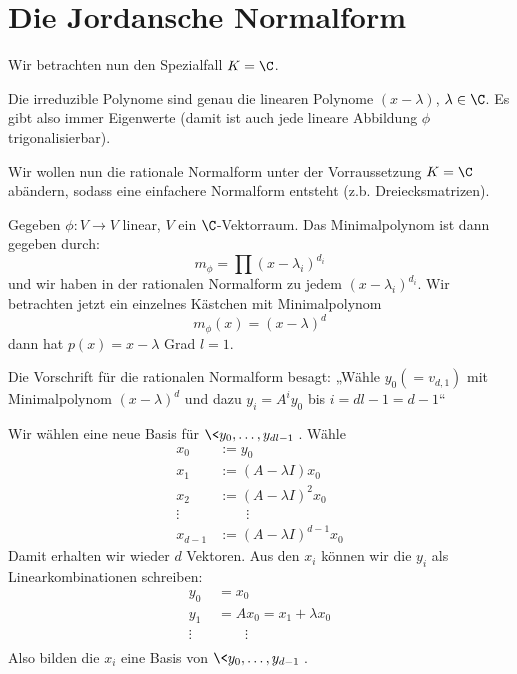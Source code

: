 \documentclass[a4paper, 10pt]{scrbook}
\begin{document}
\section{Die Jordansche Normalform}


Wir betrachten nun den Spezialfall $K=\C$.

Die irreduzible Polynome sind genau die linearen Polynome $(x-\lambda)$, $\lambda \in \C$.
Es gibt also immer Eigenwerte (damit ist auch jede lineare Abbildung $\phi$ trigonalisierbar).

Wir wollen nun die rationale Normalform unter der Vorraussetzung $K=\C$ abändern, sodass eine einfachere Normalform entsteht (z.b. Dreiecksmatrizen).

Gegeben $\phi : V\to V$ linear, $V$ ein $\C$-Vektorraum.
Das Minimalpolynom ist dann gegeben durch:
\[
	m_\phi = \prod (x-\lambda_i)^{d_i}
\]
und wir haben in der rationalen Normalform zu jedem $(x-\lambda_i)^{d_i}$.
Wir betrachten jetzt ein einzelnes Kästchen mit Minimalpolynom
\[
	m_\phi(x) = (x-\lambda)^d
\]
dann hat $p(x) = x-\lambda$ Grad $l=1$.

Die Vorschrift für die rationalen Normalform besagt:
„Wähle $y_0 (= v_{d,1})$ mit Minimalpolynom $(x-\lambda)^d$ und dazu $y_i = A^iy_0$ bis $i=dl-1=d-1$“

Wir wählen eine neue Basis für $\<y_0,\dotsc,y_{dl-1}\>$.
Wähle 
\begin{align*}
	x_0 &:= y_0\\
	x_1 &:= (A - \lambda I)x_0\\
	x_2 &:= (A - \lambda I)^2x_0\\
	\vdots \quad & \qquad \vdots\\
	x_{d-1} &:= (A-\lambda I)^{d-1}x_0
\end{align*}
Damit erhalten wir wieder $d$ Vektoren.
Aus den $x_i$ können wir die $y_i$ als Linearkombinationen schreiben:
\begin{align*}
	y_0 &= x_0\\
	y_1 &= Ax_0 = x_1 + \lambda x_0\\
	\vdots \quad & \qquad \vdots\\
\end{align*}
Also bilden die $x_i$ eine Basis von $\<y_0,\dotsc, y_{d-1}\>$.
\end{document}
